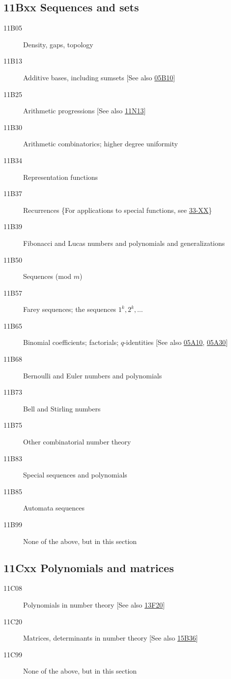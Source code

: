 \documentclass[letterpaper]{article}
\begin{document}
\subsection*{11Bxx  Sequences and sets }\label{11Bxx}
\begin{description}
\item [11B05]\label{11B05} Density, gaps, topology
\item [11B13]\label{11B13} Additive bases, including sumsets [See also \hyperref[05B10]{05B10}]
\item [11B25]\label{11B25} Arithmetic progressions [See also \hyperref[11N13]{11N13}]
\item [11B30]\label{11B30} Arithmetic combinatorics; higher degree uniformity
\item [11B34]\label{11B34} Representation functions
\item [11B37]\label{11B37} Recurrences \{For applications to special functions, see \hyperref[33-XX]{33-XX}\}
\item [11B39]\label{11B39} Fibonacci and Lucas numbers and polynomials and generalizations
\item [11B50]\label{11B50} Sequences (mod $m$)
\item [11B57]\label{11B57} Farey sequences; the sequences $1^k, 2^k, \dots$
\item [11B65]\label{11B65} Binomial coefficients; factorials; $q$-identities [See also \hyperref[05A10]{05A10}, \hyperref[05A30]{05A30}]
\item [11B68]\label{11B68} Bernoulli and Euler numbers and polynomials
\item [11B73]\label{11B73} Bell and Stirling numbers
\item [11B75]\label{11B75} Other combinatorial number theory
\item [11B83]\label{11B83} Special sequences and polynomials
\item [11B85]\label{11B85} Automata sequences
\item [11B99]\label{11B99} None of the above, but in this section
\end{description}
\subsection*{11Cxx  Polynomials and matrices }\label{11Cxx}
\begin{description}  
\item [11C08]\label{11C08} Polynomials in number theory [See also \hyperref[13F20]{13F20}]
\item [11C20]\label{11C20} Matrices, determinants in number theory [See also \hyperref[15B36]{15B36}]
\item [11C99]\label{11C99} None of the above, but in this section
\end{description}
\end{document}
